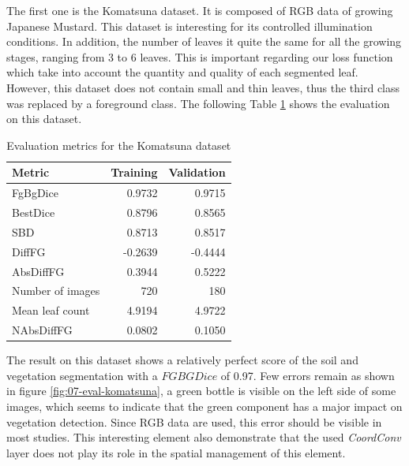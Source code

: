 \documentclass[../thesis.tex]{subfiles}
\begin{document}
    The first one is the Komatsuna dataset. It is composed of RGB data of growing Japanese Mustard. This dataset is interesting for its controlled illumination conditions. In addition, the number of leaves it quite the same for all the growing stages, ranging from 3 to 6 leaves. This is important regarding our loss function which take into account the quantity and quality of each segmented leaf. However, this dataset  does not contain small and thin leaves, thus the third class was replaced by a foreground class. The following Table \ref{tab:eval-komatsuna} shows the evaluation on this dataset.
    
    \newpage
    \null
    \vfill
    \begin{table}[H]
        \begin{tabularx}{\linewidth}{|X|r|r|}
            \hline
            \textbf{Metric} 				& \textbf{Training} &  \textbf{Validation}  \\ \hline
            FgBgDice 			&   0.9732 &   0.9715 \\
            BestDice 			&   0.8796 &   0.8565 \\
            SBD 	            &   0.8713 &   0.8517 \\
            DiffFG 		        &  -0.2639 &  -0.4444 \\
            AbsDiffFG 	        &   0.3944 &   0.5222 \\ \hline
            Number of images 	&      720 &      180 \\
            Mean leaf count 	&   4.9194 &   4.9722 \\
            NAbsDiffFG          &   0.0802 &   0.1050 \\
            \hline
        \end{tabularx}
        \caption{Evaluation metrics for the Komatsuna dataset}
        \label{tab:eval-komatsuna}
    \end{table}
    \vfill
    
    The result on this dataset shows a relatively perfect score of the soil and vegetation segmentation with a $FGBGDice$ of 0.97. Few errors remain as shown in figure \ref{fig:07-eval-komatsuna}, a green bottle is visible on the left side of some images, which seems to indicate that the green component has a major impact on vegetation detection. Since RGB data are used, this error should be visible in most studies. This interesting element also demonstrate that the used \textit{CoordConv} layer does not play its role in the spatial management of this element.
    
\end{document}
